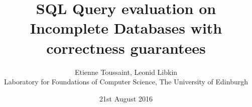 \documentclass{article}
\begin{document}

\title{SQL Query evaluation on Incomplete Databases with correctness guarantees }

\author{Etienne Toussaint, Leonid Libkin \\
	Laboratory for Foundations of Computer Science, The University of Edinburgh }

\date{21st August 2016}

\maketitle

\pagestyle{empty} %
\thispagestyle{empty}




%







%

%



%


\clearpage




\end{document}
